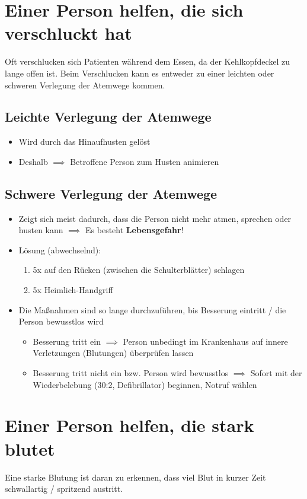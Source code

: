 \chapter{Einer Person helfen, die sich verschluckt hat}
Oft verschlucken sich Patienten während dem Essen, da der Kehlkopfdeckel zu lange offen ist. Beim Verschlucken kann es entweder zu einer leichten oder schweren Verlegung der Atemwege kommen.

\section{Leichte Verlegung der Atemwege}
\begin{itemize}
    \item Wird durch das Hinaufhusten gelöst
    \item Deshalb $\implies$ Betroffene Person zum Husten animieren
\end{itemize}

\section{Schwere Verlegung der Atemwege}
\begin{itemize}
    \item Zeigt sich meist dadurch, dass die Person nicht mehr atmen, sprechen oder husten kann $\implies$ Es besteht \textbf{Lebensgefahr}!
    \item Lösung (abwechselnd):
    \begin{enumerate}
        \item 5x auf den Rücken (zwischen die Schulterblätter) schlagen
        \item 5x Heimlich-Handgriff
    \end{enumerate}
    \item Die Maßnahmen sind so lange durchzuführen, bis Besserung eintritt / die Person bewusstlos wird
    \begin{itemize}
        \item Besserung tritt ein $\implies$ Person unbedingt im Krankenhaus auf innere Verletzungen (Blutungen) überprüfen lassen
        \item Besserung tritt nicht ein bzw. Person wird bewusstlos $\implies$ Sofort mit der Wiederbelebung (30:2, Defibrillator) beginnen, Notruf wählen
    \end{itemize}
\end{itemize}

\chapter{Einer Person helfen, die stark blutet}
Eine starke Blutung ist daran zu erkennen, dass viel Blut in kurzer Zeit schwallartig / spritzend austritt.
